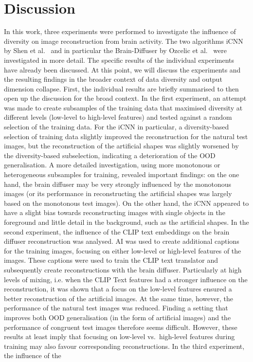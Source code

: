 \chapter{Discussion}


In this work, three experiments were performed to investigate the influence of diversity on image reconstruction from brain activity. The two algorithms iCNN by Shen et al.~\cite{shenDeepImageReconstruction2019} and in particular the Brain-Diffuser by Ozcelic et al.~\cite{ozcelikNaturalSceneReconstruction2023} were investigated in more detail. The specific results of the individual experiments have already been discussed. At this point, we will discuss the experiments and the resulting findings in the broader context of data diversity and output dimension collapse. First, the individual results are briefly summarised to then open up the discussion for the broad context. In the first experiment, an attempt was made to create subsamples of the training data that maximised diversity at different levels (low-level to high-level features) and tested against a random selection of the training data. For the iCNN in particular, a diversity-based selection of training data slightly improved the reconstruction for the natural test images, but the reconstruction of the artificial shapes was slightly worsened by the diversity-based subselection, indicating a deterioration of the OOD generalisation. A more detailed investigation, using more monotonous or heterogeneous subsamples for training, revealed important findings: on the one hand, the brain diffuser may be very strongly influenced by the monotonous images (or its performance in reconstructing the artificial shapes was largely based on the monotonous test images). On the other hand, the iCNN appeared to have a slight bias towards reconstructing images with single objects in the foreground and little detail in the background, such as the artificial shapes. In the second experiment, the influence of the CLIP text embeddings on the brain diffuser reconstruction was analysed. AI was used to create additional captions for the training images, focusing on either low-level or high-level features of the images. These captions were used to train the CLIP text translator and subsequently create reconstructions with the brain diffuser. Particularly at high levels of mixing, i.e. when the CLIP Text features had a stronger influence on the reconstruction, it was shown that a focus on the low-level features ensured a better reconstruction of the artificial images. At the same time, however, the performance of the natural test images was reduced. Finding a setting that improves both OOD generalisation (in the form of artificial images) and the performance of congruent test images therefore seems difficult. However, these results at least imply that focusing on low-level vs.\ high-level features during training may also favour corresponding reconstructions. In the third experiment, the influence of the 